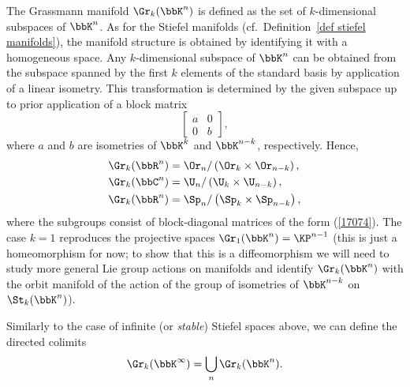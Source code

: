 \begin{defn}
    The Grassmann manifold $\Gr_k(\bbK^n)$ is defined as the set of $k$-dimensional subspaces of $\bbK^n$. As for the Stiefel manifolds (cf.\ Definition~\ref{def stiefel manifolds}), the manifold structure is obtained by identifying it with a homogeneous space. Any $k$-dimensional subspace of $\bbK^n$ can be obtained from the subspace spanned by the first $k$ elements of the standard basis by application of a linear isometry. This transformation is determined by the given subspace up to prior application of a block matrix
    \[\begin{bmatrix}
        a&0\\0&b
    \end{bmatrix},\label{17074}\]
    where $a$ and $b$ are isometries of $\bbK^k$ and $\bbK^{n-k}$, respectively. Hence,
    \begin{align}
        \Gr_k(\bbR^n)&=\Or_n\slash \left(\Or_k\times\Or_{n-k}\right),\\
        \Gr_k(\bbC^n)&=\U_n\slash \left(\U_k\times\U_{n-k}\right),\\
        \Gr_k(\bbR^n)&=\Sp_n\slash \left(\Sp_k\times\Sp_{n-k}\right),
    \end{align}
    where the subgroups consist of block-diagonal matrices of the form (\ref{17074}). The case $k=1$ reproduces the projective spaces $\Gr_1(\bbK^n)=\KP^{n-1}$ (this is just a homeomorphism for now; to show that this is a diffeomorphism we will need to study more general Lie group actions on manifolds and identify $\Gr_k(\bbK^n)$ with the orbit manifold of the action of the group of isometries of $\bbK^{n-k}$ on $\St_k(\bbK^n)$).
\end{defn}


\begin{defn}
    Similarly to the case of infinite (or \emph{stable}) Stiefel spaces above, we can define the directed colimits
    \[\Gr_k(\bbK^\infty)=\bigcup_n \Gr_k(\bbK^n).\]
\end{defn}

